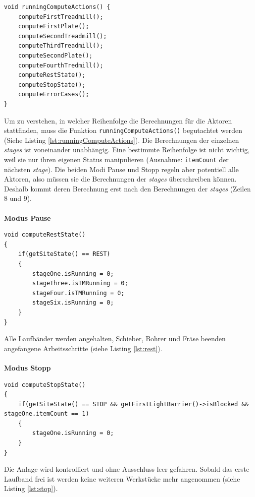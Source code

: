\documentclass[fontsize=11pt,a4paper,final]{scrartcl}[2003/01/01]
\begin{document}
\begin{lstlisting}[caption={Die Funktion \lstinline|runningComputeActions|},label={lst:runningComputeActions}]
void runningComputeActions() {
	computeFirstTreadmill();
	computeFirstPlate();
	computeSecondTreadmill();
	computeThirdTreadmill();
	computeSecondPlate();
	computeFourthTredmill();
	computeRestState();
	computeStopState();
	computeErrorCases();
}
\end{lstlisting}
Um zu verstehen, in welcher Reihenfolge die Berechnungen für die Aktoren stattfinden, muss die Funktion \lstinline|runningComputeActions()| begutachtet werden (Siehe Listing \ref{lst:runningComputeActions}). Die Berechnungen der einzelnen \textit{stages} ist voneinander unabhängig. Eine bestimmte Reihenfolge ist nicht wichtig, weil sie nur ihren eigenen Status manipulieren (Ausnahme: \lstinline|itemCount| der nächsten \textit{stage}). Die beiden Modi Pause und Stopp regeln aber potentiell alle Aktoren, also müssen sie die Berechnungen der \textit{stages} überschreiben können. Deshalb kommt deren Berechnung erst nach den Berechnungen der \textit{stages} (Zeilen 8 und 9). \\ \\
\textbf{Modus Pause}
\begin{lstlisting}[caption={Die Pause Funktion},label={lst:rest}]
void computeRestState()
{
	if(getSiteState() == REST)
	{
		stageOne.isRunning = 0;
		stageThree.isTMRunning = 0;
		stageFour.isTMRunning = 0;
		stageSix.isRunning = 0;
	}
}
\end{lstlisting}
Alle Laufbänder werden angehalten, Schieber, Bohrer und Fräse beenden angefangene Arbeitsschritte (siehe Listing \ref{lst:rest}). \\ \\
\textbf{Modus Stopp}
\begin{lstlisting}[caption={Die Stopp Funktion},label={lst:stop}]
void computeStopState()
{
	if(getSiteState() == STOP && getFirstLightBarrier()->isBlocked && stageOne.itemCount == 1)
	{
		stageOne.isRunning = 0;
	}
}
\end{lstlisting}
Die Anlage wird kontrolliert und ohne Ausschluss leer gefahren. Sobald das erste Laufband frei ist werden keine weiteren Werkstücke mehr angenommen (siehe Listing \ref{lst:stop}).
\end{document}
